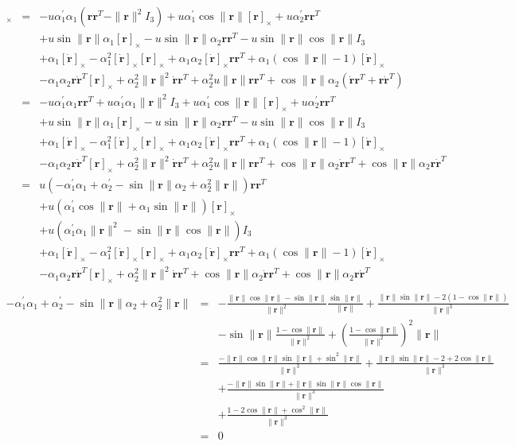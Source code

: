 \documentclass {article}
\newcommand\rot{\mathbf{r}}
\newcommand\rcross{[\rot]_{\times}}
\newcommand\omegacross{[\omega]_{\times}}
\newcommand\rdotcross{\left[\dot{\rot}\right]_{\times}}
\newcommand\normr{\|\rot\|}
\newcommand\alphap{\alpha^{\prime}}
\begin{document}
\begin{eqnarray*}
\omegacross &=&
- u \alphap_1\alpha_1 (\rot\rot^T-\normr^2 I_3) + u \alphap_1 \cos\normr \rcross + u\alphap_2 \rot\rot^T\\
&& + u \sin\normr\alpha_1 \rcross - u \sin\normr\alpha_2 \rot\rot^T - u \sin\normr\cos\normr I_3\\
&& +\alpha_1 \rdotcross - \alpha_1^2 \rdotcross\rcross + \alpha_1 \alpha_2 \rdotcross\rot\rot^T + \alpha_1(\cos\normr-1)\rdotcross\\
&&- \alpha_1 \alpha_2 \rot\dot{\rot}^T\rcross +  \alpha_2^2\normr^2\dot{\rot}\rot^T + \alpha_2^2u\normr\rot\rot^T + \cos\normr\alpha_2 (\dot{\rot}\rot^T + \rot\dot{\rot}^T)\\
&=& - u \alphap_1\alpha_1 \rot\rot^T + u \alphap_1\alpha_1\normr^2 I_3 + u \alphap_1 \cos\normr \rcross + u\alphap_2 \rot\rot^T\\
&& + u \sin\normr\alpha_1 \rcross - u \sin\normr\alpha_2 \rot\rot^T - u \sin\normr\cos\normr I_3\\
&& +\alpha_1 \rdotcross - \alpha_1^2 \rdotcross\rcross + \alpha_1 \alpha_2 \rdotcross\rot\rot^T + \alpha_1(\cos\normr-1)\rdotcross\\
&&- \alpha_1 \alpha_2 \rot\dot{\rot}^T\rcross +  \alpha_2^2\normr^2\dot{\rot}\rot^T + \alpha_2^2u\normr\rot\rot^T + \cos\normr\alpha_2\dot{\rot}\rot^T + \cos\normr\alpha_2\rot\dot{\rot}^T\\
&=& u \left(-\alphap_1\alpha_1 + \alphap_2 - \sin\normr\alpha_2 + \alpha_2^2\normr\right)\rot\rot^T \\
&&+ u\left(\alphap_1 \cos\normr + \alpha_1\sin\normr\right) \rcross\\
&&+ u\left(\alphap_1\alpha_1\normr^2 - \sin\normr\cos\normr\right) I_3\\
&& +\alpha_1 \rdotcross - \alpha_1^2 \rdotcross\rcross + \alpha_1 \alpha_2 \rdotcross\rot\rot^T + \alpha_1(\cos\normr-1)\rdotcross\\
&&- \alpha_1 \alpha_2 \rot\dot{\rot}^T\rcross +  \alpha_2^2\normr^2\dot{\rot}\rot^T + \cos\normr\alpha_2\dot{\rot}\rot^T + \cos\normr\alpha_2\rot\dot{\rot}^T\\
\end{eqnarray*}
\begin{eqnarray*}
-\alphap_1\alpha_1 + \alphap_2 - \sin\normr\alpha_2 + \alpha_2^2\normr
&=&
-\frac{\normr \cos \normr - \sin \normr}{\normr^2}\frac{\sin \normr}{\normr} + \frac{\normr \sin \normr -2(1-\cos \normr)}{\normr^3}\\
&& - \sin\normr\frac{1 - \cos \normr}{\normr^2} + \left(\frac{1 - \cos \normr}{\normr^2}\right)^2\normr\\
&=&\frac{-\normr \cos \normr \sin \normr + \sin^2 \normr}{\normr^3}+\frac{\normr \sin \normr -2+2\cos \normr}{\normr^3}\\
&& +\frac{-\normr\sin\normr + \normr\sin\normr\cos \normr}{\normr^3}\\
&&+\frac{1 - 2\cos \normr + \cos^2 \normr}{\normr^3}\\
&=& 0
\end{eqnarray*}
\end{document}
